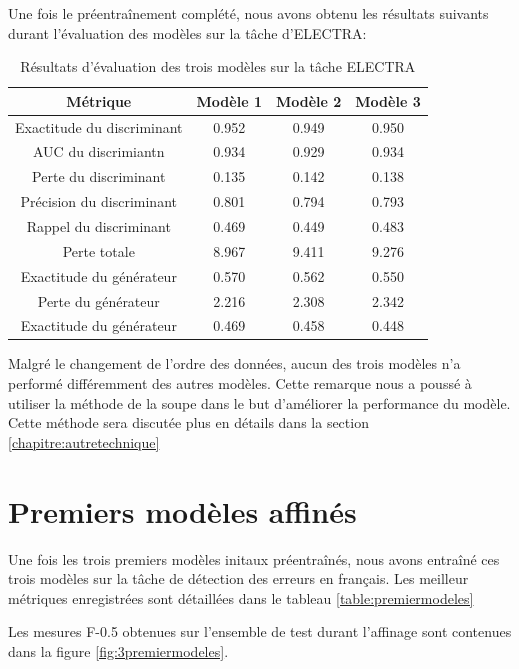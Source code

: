 \documentclass[12pt,twoside,maitrise]{dms}
\theoremstyle{definition}
\numberwithin{equation}{section}
\numberwithin{table}{chapter}
\numberwithin{figure}{chapter}
\begin{document}
Une fois le préentraînement complété, nous avons obtenu les résultats suivants
durant l'évaluation des modèles sur la tâche d'ELECTRA:

\begin{table}[h!]
\centering
\begin{tabular}{||c | c c c||}
 \hline
    Métrique & Modèle 1 & Modèle 2 & Modèle 3 \\ [0.5ex]
 \hline\hline
    Exactitude du discriminant & 0.952 &  0.949 & 0.950 \\
    AUC du discrimiantn & 0.934 &  0.929 & 0.934 \\
    Perte du discriminant & 0.135 &  0.142 & 0.138 \\
    Précision du discriminant & 0.801 &  0.794 & 0.793 \\
    Rappel du discriminant & 0.469 &  0.449 & 0.483 \\
    Perte totale & 8.967 &  9.411 & 9.276 \\
    Exactitude du générateur & 0.570 &  0.562 & 0.550 \\
    Perte du générateur & 2.216 &  2.308 & 2.342 \\
    Exactitude du générateur & 0.469 &  0.458 & 0.448 \\
 \hline
\end{tabular}
\caption{Résultats d'évaluation des trois modèles sur la tâche ELECTRA}
\label{table:respreentrainementsanscasse}
\end{table}
Malgré le changement de l'ordre des données, aucun des trois modèles n'a
performé différemment des autres modèles. Cette remarque nous a poussé à
utiliser la méthode de la soupe \cite{soup} dans le but d'améliorer la
performance du modèle. Cette méthode sera discutée plus en détails dans la
section \ref{chapitre:autretechnique}


\section{Premiers modèles affinés}
Une fois les trois premiers modèles initaux préentraînés, nous avons entraîné
ces trois modèles sur la tâche de détection des erreurs en français. Les
meilleur métriques enregistrées sont détaillées dans le tableau
\ref{table:premiermodeles}

Les mesures F-0.5 obtenues sur l'ensemble de test durant
l'affinage sont contenues dans la figure \ref{fig:3premiermodeles}.

\end{document}
